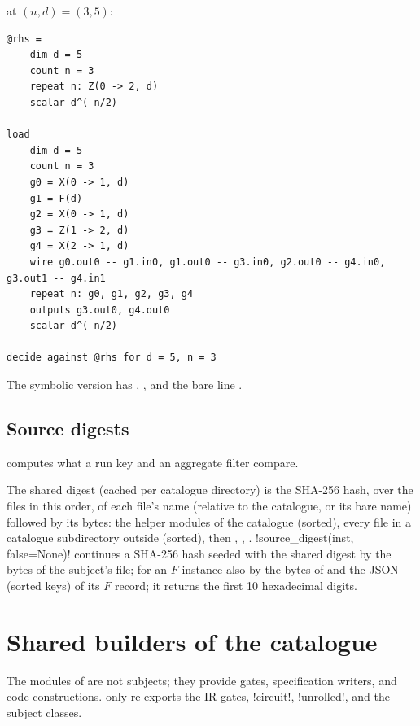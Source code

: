 \begin{example}
 at $(n,d) = (3,5)$:
\begin{lstlisting}[style=azx]
@rhs =
    dim d = 5
    count n = 3
    repeat n: Z(0 -> 2, d)
    scalar d^(-n/2)

load
    dim d = 5
    count n = 3
    g0 = X(0 -> 1, d)
    g1 = F(d)
    g2 = X(0 -> 1, d)
    g3 = Z(1 -> 2, d)
    g4 = X(2 -> 1, d)
    wire g0.out0 -- g1.in0, g1.out0 -- g3.in0, g2.out0 -- g4.in0, g3.out1 -- g4.in1
    repeat n: g0, g1, g2, g3, g4
    outputs g3.out0, g4.out0
    scalar d^(-n/2)

decide against @rhs for d = 5, n = 3
\end{lstlisting}
The symbolic version has , , and the bare line .
\end{example}

\subsection{Source digests}\label{sec:bench-sources}

 computes what a run key and an aggregate filter compare.

\begin{definition}
The shared digest (cached per catalogue directory) is the SHA-256 hash, over the files in this
order, of each file's name (relative to the catalogue, or its bare name) followed by its bytes:
the helper modules  of the catalogue (sorted), every file in a catalogue
subdirectory outside  (sorted), then , ,
. \py!source_digest(inst, false=None)! continues a SHA-256 hash seeded with the
shared digest by the bytes of the subject's file; for an $F$ instance also by the bytes of
 and the JSON (sorted keys) of its $F$ record; it returns the first 10
hexadecimal digits.
\end{definition}

\section{Shared builders of the catalogue}\label{sec:bench-helpers}

The modules  of  are not subjects; they provide gates,
specification writers, and code constructions.  only re-exports the IR gates,
\py!circuit!, \py!unrolled!, and the subject classes.

